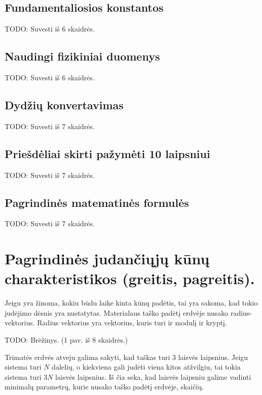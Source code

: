 \subsection{Fundamentaliosios konstantos}


TODO: Suvesti iš 6 skaidrės.

\subsection{Naudingi fizikiniai duomenys}

TODO: Suvesti iš 6 skaidrės.

\subsection{Dydžių konvertavimas}

TODO: Suvesti iš 7 skaidrės.

\subsection{Priešdėliai skirti pažymėti 10 laipsniui}

TODO: Suvesti iš 7 skaidrės.

\subsection{Pagrindinės matematinės formulės}

TODO: Suvesti iš 7 skaidrės.

\section{Pagrindinės judančiųjų kūnų charakteristikos (greitis, pagreitis).}

Jeigu yra žinoma, kokiu būdu laike kinta kūnų padėtis, tai yra sakoma,
kad tokio judėjimo dėsnis yra nustatytas. Materialaus taško padėtį
erdvėje nusako radius-vektorius. Radius vektorius yra vektorius, kuris
turi ir modulį ir kryptį.

TODO: Brėžinys. (1 pav. iš 8 skaidrės.)

Trimatės erdvės atveju galima sakyti, kad taškas turi 3 laisvės
laipsnius. Jeigu sistema turi $N$ dalelių, o kiekviena gali
judėti viena kitos atžvilgiu, tai tokia sistema turi $3N$ laisvės
laipsnius. Iš čia seka, kad laisvės laipsniu galime vadinti
minimalų parametrų, kurie nusako taško padėtį erdvėje, skaičių.

